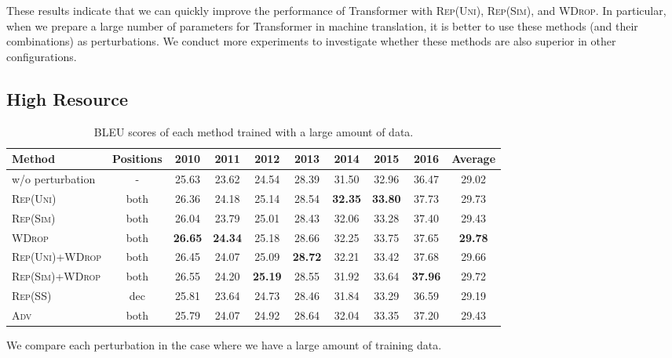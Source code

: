 \documentclass[11pt]{article}
\newcommand{\uniform}{\textsc{Rep(Uni)}}
\newcommand{\parass}{\textsc{Rep(SS)}}
\newcommand{\similarity}{\textsc{Rep(Sim)}}
\newcommand{\worddrop}{\textsc{WDrop}}
\newcommand{\adv}{\textsc{Adv}}
\begin{document}
These results indicate that we can quickly improve the performance of Transformer with \uniform{}, \similarity{}, and \worddrop{}.
In particular, when we prepare a large number of parameters for Transformer in machine translation, it is better to use these methods (and their combinations) as perturbations.
We conduct more experiments to investigate whether these methods are also superior in other configurations.

\subsection{High Resource}
\label{sec:ex_mt_high_resource}
\begin{table*}[!t]
  \centering
  \footnotesize
  \begin{tabular}{ l | c | c c c c c c c | c } \hline
  Method & Positions & 2010 & 2011 & 2012 & 2013 & 2014 & 2015 & 2016 & Average \\ \hline
  w/o perturbation & - & 25.63 & 23.62 & 24.54 & 28.39 & 31.50 & 32.96 & 36.47 & 29.02\\ \hline
  \uniform{} & both & 26.36 & 24.18 & 25.14 & 28.54 & \textbf{32.35} & \textbf{33.80} & 37.73 & 29.73 \\
  \similarity{} & both & 26.04 & 23.79 & 25.01 & 28.43 & 32.06 & 33.28 & 37.40 & 29.43 \\
  \worddrop{} & both & \textbf{26.65} & \textbf{24.34} & 25.18 & 28.66 & 32.25 & 33.75 & 37.65 & \textbf{29.78} \\
  \uniform{}+\worddrop{} & both & 26.45 & 24.07 & 25.09 & \textbf{28.72} & 32.21 & 33.42 & 37.68 & 29.66\\
  \similarity{}+\worddrop{} & both & 26.55 & 24.20 & \textbf{25.19} & 28.55 & 31.92 & 33.64 & \textbf{37.96} & 29.72 \\
  \parass{} & dec & 25.81 & 23.64 & 24.73 & 28.46 & 31.84 & 33.29 & 36.59 & 29.19 \\
  \adv{} & both & 25.79 & 24.07 & 24.92 & 28.64 & 32.04 & 33.35 & 37.20 & 29.43 \\ \hline
  \end{tabular}
  \caption{BLEU scores of each method trained with a large amount of data.\label{tab:exp_mt_on_high_resource}}
\end{table*}

We compare each perturbation in the case where we have a large amount of training data.
\end{document}
